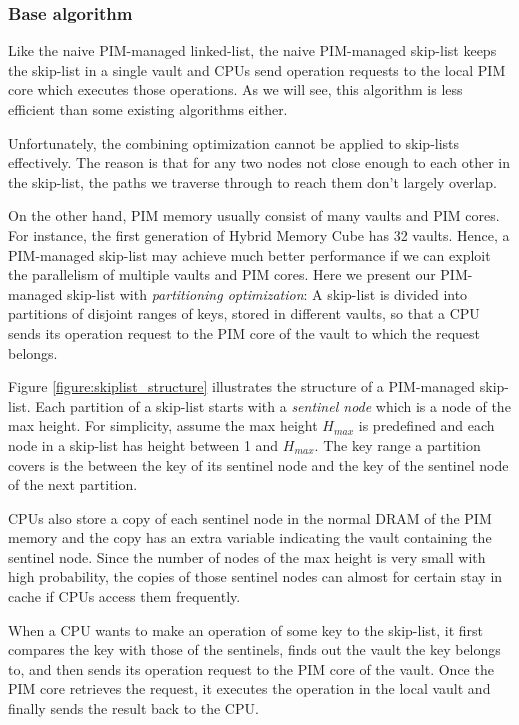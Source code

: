 \documentclass[11pt, letterpaper]{article}   	%
\begin{document}
\subsubsection{Base algorithm}
Like the naive PIM-managed linked-list,
the naive PIM-managed skip-list keeps the skip-list in a single vault and
CPUs send operation requests to the local PIM core which executes those operations.
As we will see, this algorithm is less efficient than some existing algorithms either.

Unfortunately, the combining optimization cannot be applied to skip-lists effectively.
The reason is that for any two nodes not close enough to each other in the skip-list,
the paths we traverse through to reach them don't largely overlap.

On the other hand, PIM memory usually consist of many vaults and PIM cores.
For instance, the first generation of Hybrid Memory Cube \cite{website:HMC} has 32 vaults.
Hence, a PIM-managed skip-list may achieve much better performance if
we can exploit the parallelism of multiple vaults and PIM cores.
Here we present our PIM-managed skip-list with \emph{partitioning optimization}:
A skip-list is divided into partitions of disjoint ranges of keys,
stored in different vaults, so that a CPU sends its operation request to
the PIM core of the vault to which the request belongs.

Figure \ref{figure:skiplist_structure} illustrates the structure of a PIM-managed skip-list.
Each partition of a skip-list starts with a \emph{sentinel node}
which is a node of the max height. For simplicity, assume the max height $H_{max}$ 
is predefined and each node in a skip-list has height between 1 and $H_{max}$.
The key range a partition covers is the between the key of its sentinel node and
the key of the sentinel node of the next partition.

CPUs also store a copy of each sentinel node in the normal DRAM of the PIM memory 
and the copy has an extra variable indicating the vault containing the sentinel node.
Since the number of nodes of the max height is very small with high probability, 
the copies of those sentinel nodes can almost for certain stay in cache
if CPUs access them frequently.

When a CPU wants to make an operation of some key to the skip-list,
it first compares the key with those of the sentinels, finds out the vault
the key belongs to, and then sends its operation request to
the PIM core of the vault.
Once the PIM core retrieves the request, it executes the operation in the local vault 
and finally sends the result back to the CPU.
\end{document}
